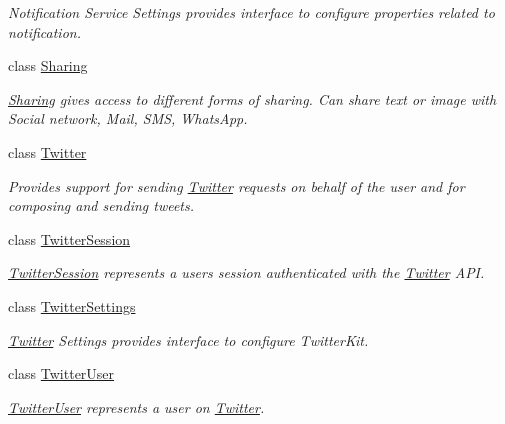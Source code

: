 \begin{DoxyCompactItemize}
\begin{DoxyCompactList}\small\item\em Notification Service Settings provides interface to configure properties related to notification. \end{DoxyCompactList}\item 
class \hyperlink{class_voxel_busters_1_1_native_plugins_1_1_sharing}{Sharing}
\begin{DoxyCompactList}\small\item\em \hyperlink{class_voxel_busters_1_1_native_plugins_1_1_sharing}{Sharing} gives access to different forms of sharing. Can share text or image with Social network, Mail, S\+M\+S, Whats\+App. \end{DoxyCompactList}\item 
class \hyperlink{class_voxel_busters_1_1_native_plugins_1_1_twitter}{Twitter}
\begin{DoxyCompactList}\small\item\em Provides support for sending \hyperlink{class_voxel_busters_1_1_native_plugins_1_1_twitter}{Twitter} requests on behalf of the user and for composing and sending tweets. \end{DoxyCompactList}\item 
class \hyperlink{class_voxel_busters_1_1_native_plugins_1_1_twitter_session}{Twitter\+Session}
\begin{DoxyCompactList}\small\item\em \hyperlink{class_voxel_busters_1_1_native_plugins_1_1_twitter_session}{Twitter\+Session} represents a user\textquotesingle{}s session authenticated with the \hyperlink{class_voxel_busters_1_1_native_plugins_1_1_twitter}{Twitter} A\+P\+I. \end{DoxyCompactList}\item 
class \hyperlink{class_voxel_busters_1_1_native_plugins_1_1_twitter_settings}{Twitter\+Settings}
\begin{DoxyCompactList}\small\item\em \hyperlink{class_voxel_busters_1_1_native_plugins_1_1_twitter}{Twitter} Settings provides interface to configure Twitter\+Kit. \end{DoxyCompactList}\item 
class \hyperlink{class_voxel_busters_1_1_native_plugins_1_1_twitter_user}{Twitter\+User}
\begin{DoxyCompactList}\small\item\em \hyperlink{class_voxel_busters_1_1_native_plugins_1_1_twitter_user}{Twitter\+User} represents a user on \hyperlink{class_voxel_busters_1_1_native_plugins_1_1_twitter}{Twitter}. \end{DoxyCompactList}\item 

\end{DoxyCompactItemize}
